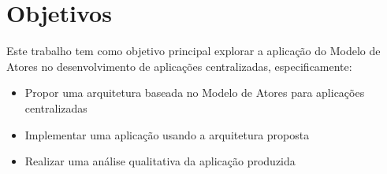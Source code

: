 \section{Objetivos}

Este trabalho tem como objetivo principal explorar a aplicação do Modelo de Atores no desenvolvimento de aplicações centralizadas, especificamente:

\begin{itemize}
    \item Propor uma arquitetura baseada no Modelo de Atores para aplicações centralizadas
    \item Implementar uma aplicação usando a arquitetura proposta
    \item Realizar uma análise qualitativa da aplicação produzida
\end{itemize}
